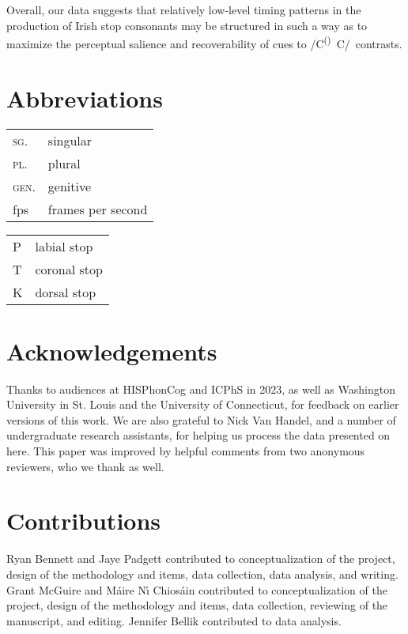 \documentclass[output=paper,colorlinks,citecolor=brown]{langscibook}
\newcommand{\pal}{\ipa{ʲ}}
\newcommand{\vel}{\ipa{ˠ}}
\newcommand{\velop}{\textsuperscript{(}\vel\textsuperscript{)}}
\newcommand{\palcongen}{/C\velop\ C\pal/}
\begin{document}
Overall, our data suggests that relatively low-level timing patterns in the production of Irish stop consonants may be structured in such a way as to maximize the perceptual salience and recoverability of cues to \palcongen\ contrasts.





\section*{Abbreviations}
\begin{tabularx}{.5\textwidth}{@{}lQ@{}}
\textsc{sg.} & singular\\
\textsc{pl.} & plural\\
\textsc{gen.} & genitive\\
fps & frames per second\\
\end{tabularx}%
\begin{tabularx}{.5\textwidth}{@{}lQ@{}}
P & labial stop\\
T & coronal stop\\
K & dorsal stop\\
\end{tabularx}

\section*{Acknowledgements}
{Thanks to audiences at HISPhonCog and ICPhS in 2023, as well as Washington University in St. Louis and the University of Connecticut, for feedback on earlier versions of this work. We are also grateful to Nick Van Handel, and a number of undergraduate research assistants, for helping us process the data presented on here. This paper was improved by helpful comments from two anonymous reviewers, who we thank as well.}

\section*{Contributions}
Ryan Bennett and Jaye Padgett contributed to conceptualization of the project, design of the methodology and items, data collection, data analysis, and writing.
Grant McGuire and M\'aire N\'{\i} Chios\'ain contributed to conceptualization of the project, design of the methodology and items, data collection, reviewing of the manuscript, and editing.
Jennifer Bellik contributed to data analysis.


\label{appendix:bennett:A}
\end{document}

